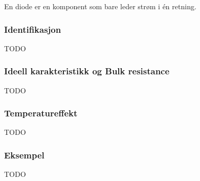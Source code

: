 En diode er en komponent som bare leder strøm i én retning.

\subsubsection{Identifikasjon}
TODO

\subsubsection{Ideell karakteristikk og Bulk resistance}
TODO

\subsubsection{Temperatureffekt}
TODO

\subsubsection{Eksempel}
TODO
